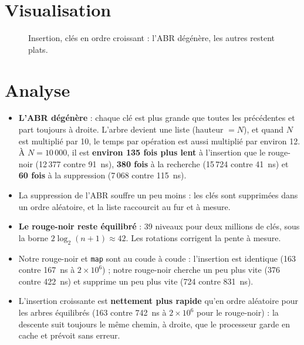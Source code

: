 \documentclass[12pt,a4paper]{report}
\begin{document}
\section{Visualisation}
\begin{figure}[H]
\centering
{}
\caption{Insertion, clés en ordre croissant : l'ABR dégénère, les autres restent plats.}
\end{figure}

\section{Analyse}
\begin{itemize}
  \item \textbf{L'ABR dégénère} : chaque clé est plus grande que toutes les précédentes et part toujours à droite. L'arbre devient une liste (hauteur $= N$), et quand $N$ est multiplié par 10, le temps par opération est aussi multiplié par environ 12. À $N = 10\,000$, il est \textbf{environ 135 fois plus lent} à l'insertion que le rouge-noir (12\,377 contre 91~ns), \textbf{380 fois} à la recherche (15\,724 contre 41~ns) et \textbf{60 fois} à la suppression (7\,068 contre 115~ns).
  \item La suppression de l'ABR souffre un peu moins : les clés sont supprimées dans un ordre aléatoire, et la liste raccourcit au fur et à mesure.
  \item \textbf{Le rouge-noir reste équilibré} : 39 niveaux pour deux millions de clés, sous la borne $2\log_2(n+1) \approx 42$. Les rotations corrigent la pente à mesure.
  \item Notre rouge-noir et \texttt{map} sont au coude à coude : l'insertion est identique (163 contre 167~ns à $2\times10^6$) ; notre rouge-noir cherche un peu plus vite (376 contre 422~ns) et supprime un peu plus vite (724 contre 831~ns).
  \item L'insertion croissante est \textbf{nettement plus rapide} qu'en ordre aléatoire pour les arbres équilibrés (163 contre 742~ns à $2\times10^6$ pour le rouge-noir) : la descente suit toujours le même chemin, à droite, que le processeur garde en cache et prévoit sans erreur.
\end{itemize}
\end{document}
